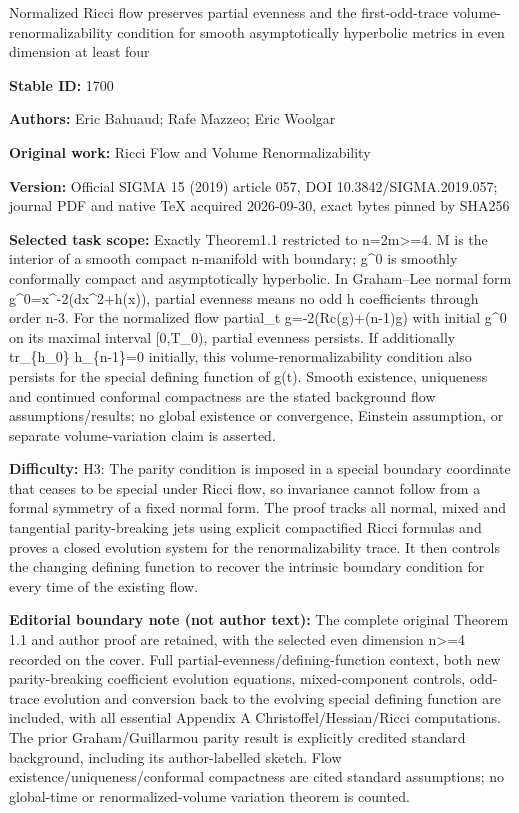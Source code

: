 \documentclass[11pt]{article}
\numberwithin{equation}{section}
\begin{document}
\begin{center}\Large Normalized Ricci flow preserves partial evenness and the first-odd-trace volume-renormalizability condition for smooth asymptotically hyperbolic metrics in even dimension at least four\end{center}
\noindent\textbf{Stable ID:} 1700\par
\noindent\textbf{Authors:} Eric Bahuaud; Rafe Mazzeo; Eric Woolgar\par
\noindent\textbf{Original work:} Ricci Flow and Volume Renormalizability\par
\noindent\textbf{Version:} Official SIGMA 15 (2019) article 057, DOI 10.3842/SIGMA.2019.057; journal PDF and native TeX acquired 2026-09-30, exact bytes pinned by SHA256\par
\noindent\textbf{Selected task scope:} Exactly Theorem1.1 restricted to n=2m>=4. M is the interior of a smooth compact n-manifold with boundary; g\textasciicircum{}0 is smoothly conformally compact and asymptotically hyperbolic. In Graham–Lee normal form g\textasciicircum{}0=x\textasciicircum{}-2(dx\textasciicircum{}2+h(x)), partial evenness means no odd h coefficients through order n-3. For the normalized flow partial\_t g=-2(Rc(g)+(n-1)g) with initial g\textasciicircum{}0 on its maximal interval [0,T\_0), partial evenness persists. If additionally tr\_\{h\_0\} h\_\{n-1\}=0 initially, this volume-renormalizability condition also persists for the special defining function of g(t). Smooth existence, uniqueness and continued conformal compactness are the stated background flow assumptions/results; no global existence or convergence, Einstein assumption, or separate volume-variation claim is asserted.\par
\noindent\textbf{Difficulty:} H3: The parity condition is imposed in a special boundary coordinate that ceases to be special under Ricci flow, so invariance cannot follow from a formal symmetry of a fixed normal form. The proof tracks all normal, mixed and tangential parity-breaking jets using explicit compactified Ricci formulas and proves a closed evolution system for the renormalizability trace. It then controls the changing defining function to recover the intrinsic boundary condition for every time of the existing flow.\par
\noindent\textbf{Editorial boundary note (not author text):} The complete original Theorem 1.1 and author proof are retained, with the selected even dimension n>=4 recorded on the cover. Full partial-evenness/defining-function context, both new parity-breaking coefficient evolution equations, mixed-component controls, odd-trace evolution and conversion back to the evolving special defining function are included, with all essential Appendix A Christoffel/Hessian/Ricci computations. The prior Graham/Guillarmou parity result is explicitly credited standard background, including its author-labelled sketch. Flow existence/uniqueness/conformal compactness are cited standard assumptions; no global-time or renormalized-volume variation theorem is counted.\par
\end{document}
